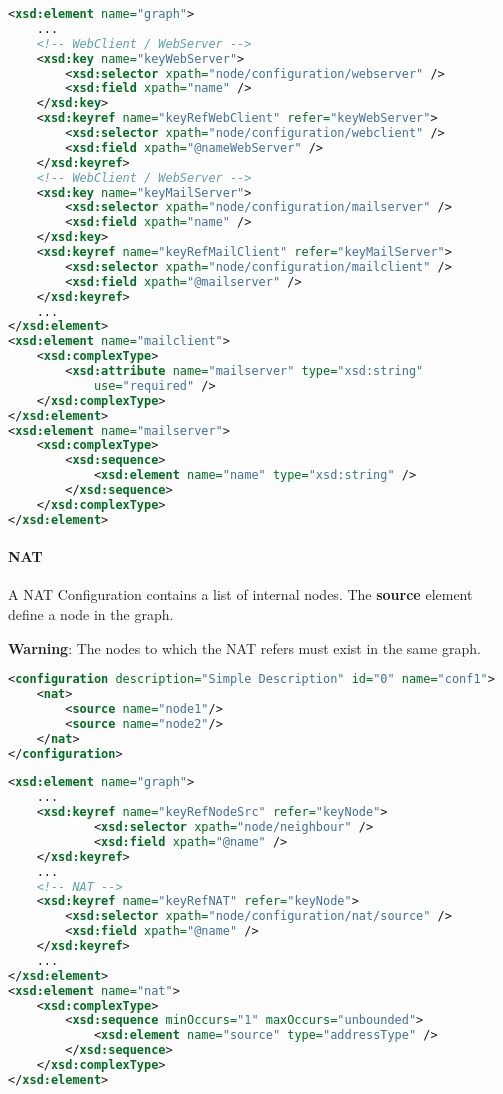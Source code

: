 \begin{lstlisting}[language=XML, caption=MailClient and MailServer schema code snippet]
<xsd:element name="graph">
    ...
    <!-- WebClient / WebServer -->
    <xsd:key name="keyWebServer">
        <xsd:selector xpath="node/configuration/webserver" />
        <xsd:field xpath="name" />
    </xsd:key>
    <xsd:keyref name="keyRefWebClient" refer="keyWebServer">
        <xsd:selector xpath="node/configuration/webclient" />
        <xsd:field xpath="@nameWebServer" />
    </xsd:keyref>
    <!-- WebClient / WebServer -->
    <xsd:key name="keyMailServer">
        <xsd:selector xpath="node/configuration/mailserver" />
        <xsd:field xpath="name" />
    </xsd:key>
    <xsd:keyref name="keyRefMailClient" refer="keyMailServer">
        <xsd:selector xpath="node/configuration/mailclient" />
        <xsd:field xpath="@mailserver" />
    </xsd:keyref>
    ...
</xsd:element>
<xsd:element name="mailclient">
    <xsd:complexType>
        <xsd:attribute name="mailserver" type="xsd:string"
            use="required" />
    </xsd:complexType>
</xsd:element>
<xsd:element name="mailserver">
    <xsd:complexType>
        <xsd:sequence>
            <xsd:element name="name" type="xsd:string" />
        </xsd:sequence>
    </xsd:complexType>
</xsd:element>
\end{lstlisting}

\paragraph{NAT}
A NAT Configuration contains a list of internal nodes. The \textbf{source} element define a node in the graph.

\begin{warning}
\textbf{Warning}: The nodes to which the NAT refers must exist in the same graph.
\end{warning}

\begin{lstlisting}[language=XML, caption=NAT Configuration Example]
<configuration description="Simple Description" id="0" name="conf1">
    <nat>
    	<source name="node1"/>
    	<source name="node2"/>
    </nat>
</configuration>
\end{lstlisting}

\begin{lstlisting}[language=XML, caption=NAT schema code snippet]
<xsd:element name="graph">
    ...
    <xsd:keyref name="keyRefNodeSrc" refer="keyNode">
            <xsd:selector xpath="node/neighbour" />
            <xsd:field xpath="@name" />
    </xsd:keyref>
    ...
    <!-- NAT -->
    <xsd:keyref name="keyRefNAT" refer="keyNode">
        <xsd:selector xpath="node/configuration/nat/source" />
        <xsd:field xpath="@name" />
    </xsd:keyref>
    ...
</xsd:element>
<xsd:element name="nat">
    <xsd:complexType>
        <xsd:sequence minOccurs="1" maxOccurs="unbounded">
            <xsd:element name="source" type="addressType" />
        </xsd:sequence>
    </xsd:complexType>
</xsd:element>
\end{lstlisting}

